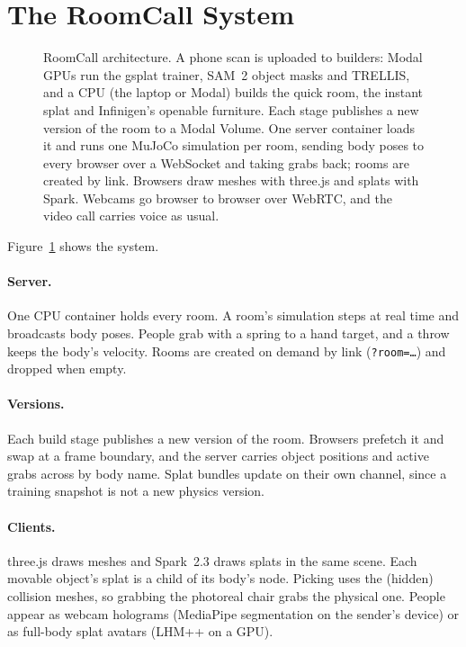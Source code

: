 \documentclass[sigconf,review,anonymous]{acmart}
\newcommand{\sys}{RoomCall}
\begin{document}
\section{The \sys{} System}
\begin{figure}[t]
  \centering
  
  \caption{\sys{} architecture. A phone scan is uploaded to builders: Modal GPUs run the gsplat
  trainer, SAM~2 object masks and TRELLIS, and a CPU (the laptop or Modal) builds the quick room,
  the instant splat and Infinigen's openable furniture. Each stage publishes a new version of the
  room to a Modal Volume. One server container loads it and runs one MuJoCo simulation per room,
  sending body poses to every browser over a WebSocket and taking grabs back; rooms are created
  by link. Browsers draw meshes with three.js and splats with Spark. Webcams go browser to browser
  over WebRTC, and the video call carries voice as usual.}
  \label{fig:architecture}
\end{figure}
Figure~\ref{fig:architecture} shows the system.

\paragraph{Server.} One CPU container holds every room. A room's simulation steps at real time
and broadcasts body poses. People grab with a spring to a hand target, and a throw keeps the
body's velocity. Rooms are created on demand by link (\texttt{?room=\dots}) and dropped when empty.

\paragraph{Versions.} Each build stage publishes a new version of the room. Browsers prefetch it
and swap at a frame boundary, and the server carries object positions and active grabs across by
body name. Splat bundles update on their own channel, since a training snapshot is not a new
physics version.

\paragraph{Clients.} three.js draws meshes and Spark~2.3 draws splats in the same scene. Each
movable object's splat is a child of its body's node. Picking uses the (hidden) collision meshes,
so grabbing the photoreal chair grabs the physical one. People appear as webcam holograms
(MediaPipe segmentation on the sender's device) or as full-body splat avatars (LHM++ on a GPU).
\end{document}
